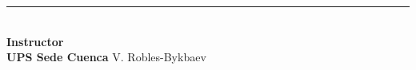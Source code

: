 \documentclass[a4paper,10pt]{article}
\begin{document}
\begin{center}

\begin{minipage}{0.2\textwidth}
\begin{flushleft}
\rule{3.3cm}{0.4pt} \\[0.5cm]
\textbf{Instructor}\\
\textbf{UPS Sede Cuenca}
V. Robles-Bykbaev
\end{flushleft}
\end{minipage}

\end{center}




\end{document}
